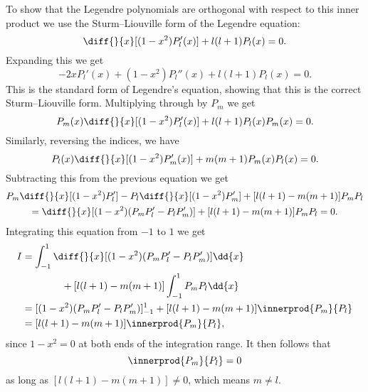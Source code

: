 \documentclass[fleqn]{NotesClass}
\begin{document}
    To show that the Legendre polynomials are orthogonal with respect to this inner product we use the Sturm--Liouville form of the Legendre equation:
    \begin{equation}
        \diff{}{x} [(1 - x^2)P_{l}'(x)] + l(l + 1)P_l(x) = 0.
    \end{equation}
    Expanding this we get
    \begin{equation}
        -2xP_l'(x) + (1 - x^2)P_l''(x) + l(l + 1)P_l(x) = 0.
    \end{equation}
    This is the standard form of Legendre's equation, showing that this is the correct Sturm--Liouville form.
    Multiplying through by \(P_m\) we get
    \begin{equation}
        P_m(x)\diff{}{x} [(1 - x^2)P_l'(x)] + l(l + 1)P_l(x)P_m(x) = 0.
    \end{equation}
    Similarly, reversing the indices, we have
    \begin{equation}
        P_l(x)\diff{}{x} [(1 - x^2)P_m'(x)] + m(m + 1)P_m(x)P_l(x) = 0.
    \end{equation}
    Subtracting this from the previous equation we get
    \begin{multline}
        P_m\diff{}{x} [(1 - x^2)P_l'] - P_l\diff{}{x} [(1 - x^2)P_m'] + [l(l + 1) - m(m + 1)]P_mP_l\\
        = \diff{}{x} [(1 - x^2)(P_mP_l' - P_lP_m')] + [l(l + 1) - m(m + 1)]P_mP_l = 0.
    \end{multline}
    Integrating this equation from \(-1\) to \(1\) we get
    \begin{align}
        I &= \int_{-1}^{1} \diff{}{x} [(1 - x^2)(P_mP_l' - P_lP_m')] \dd{x}\notag\\
        &\qquad\qquad+ [l(l + 1) - m(m + 1)] \int_{-1}^{1} P_m P_l \dd{x}\\
        &= [(1 - x^2)(P_mP_l' - P_lP_m')]_{-1}^{1} + [l(l + 1) - m(m + 1)] \innerprod{P_m}{P_l}\\
        &= [l(l + 1) - m(m + 1)] \innerprod{P_m}{P_l},
    \end{align}
    since \(1 - x^2 = 0\) at both ends of the integration range.
    It then follows that
    \begin{equation}
        \innerprod{P_m}{P_l} = 0
    \end{equation}
    as long as \([l(l + 1) - m(m + 1)] \ne 0\), which means \(m \ne l\).
    
\end{document}
